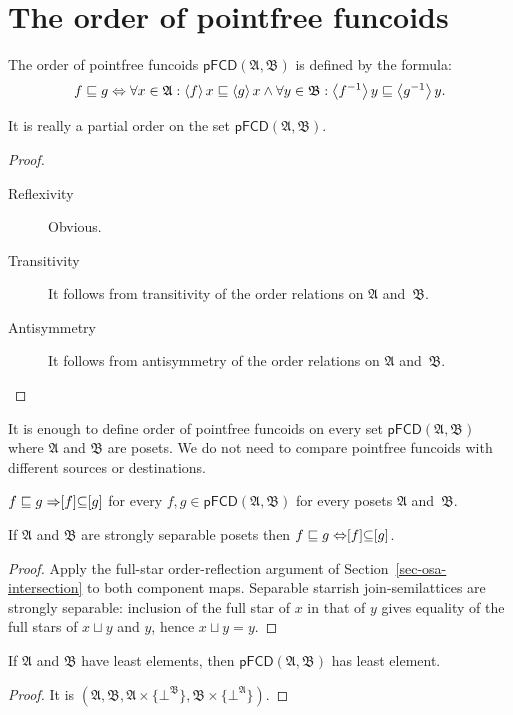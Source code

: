 \section{The order of pointfree funcoids}
\begin{defn}
The order of pointfree funcoids $\mathsf{pFCD}(\mathfrak{A},\mathfrak{B})$
is defined by the formula:
\[
f\sqsubseteq g\Leftrightarrow\forall x\in\mathfrak{A}:\left\langle f\right\rangle x\sqsubseteq\left\langle g\right\rangle x\land\forall y\in\mathfrak{B}:\left\langle f^{-1}\right\rangle y\sqsubseteq\left\langle g^{-1}\right\rangle y.
\]
\end{defn}
\begin{prop}
It is really a partial order on the set $\mathsf{pFCD}(\mathfrak{A},\mathfrak{B})$.\end{prop}
\begin{proof}
~
\begin{description}
\item [{Reflexivity}] Obvious.
\item [{Transitivity}] It follows from transitivity of the order relations
on $\mathfrak{A}$ and~$\mathfrak{B}$.
\item [{Antisymmetry}] It follows from antisymmetry of the order relations
on $\mathfrak{A}$ and~$\mathfrak{B}$.
\end{description}
\end{proof}
\begin{rem}
It is enough to define order of pointfree funcoids on every set $\mathsf{pFCD}(\mathfrak{A},\mathfrak{B})$
where $\mathfrak{A}$ and $\mathfrak{B}$ are posets. We do not need
to compare pointfree funcoids with different sources or destinations.\end{rem}
\begin{obvious}
$f\sqsubseteq g\Rightarrow\mathrel{\left[f\right]}\subseteq\mathrel{\left[g\right]}$ for every
$f,g\in\mathsf{pFCD}(\mathfrak{A},\mathfrak{B})$ for every posets
$\mathfrak{A}$ and~$\mathfrak{B}$.\end{obvious}
\begin{thm}
\label{pf-fcd-poset}If $\mathfrak{A}$ and $\mathfrak{B}$ are strongly separable
posets then $f\sqsubseteq g\Leftrightarrow\mathrel{\left[f\right]}\subseteq\mathrel{\left[g\right]}$.\end{thm}
\begin{proof}
Apply the full-star order-reflection argument of
Section~\ref{sec-osa-intersection} to both component maps. Separable
starrish join-semilattices are strongly separable: inclusion of the
full star of $x$ in that of $y$ gives equality of the full stars
of $x\sqcup y$ and $y$, hence $x\sqcup y=y$.\end{proof}
\begin{prop}
If $\mathfrak{A}$ and $\mathfrak{B}$ have least elements, then $\mathsf{pFCD}(\mathfrak{A},\mathfrak{B})$
has least element.\end{prop}
\begin{proof}
It is $(\mathfrak{A},\mathfrak{B},\mathfrak{A}\times\{\bot^{\mathfrak{B}}\},\mathfrak{B}\times\{\bot^{\mathfrak{A}}\})$.\end{proof}

